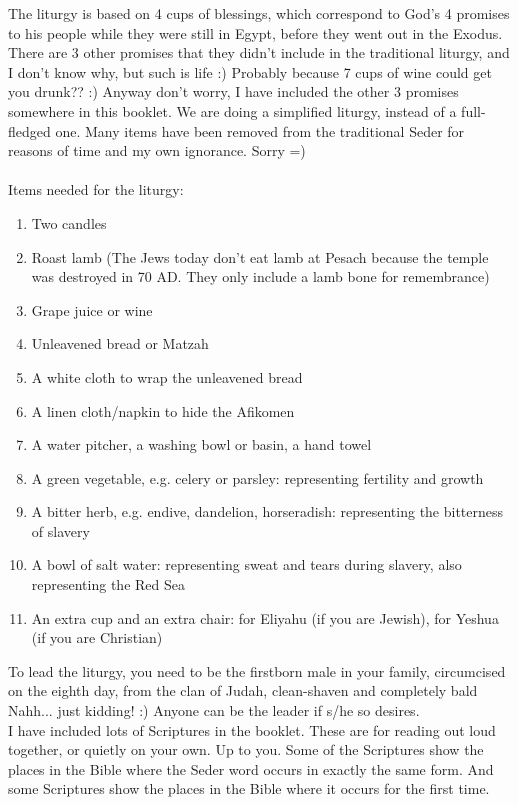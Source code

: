 \documentclass[10pt,oneside,footinclude=true,headinclude=true]{scrbook} %
\begin{document}
The liturgy is based on 4 cups of blessings, which correspond to God's 4 promises to his people while they were still in Egypt, before they went out in the Exodus. There are 3 other promises that they didn't include in the traditional liturgy, and I don't know why, but such is life :) Probably because 7 cups of wine could get you drunk?? :) Anyway don't worry, I have included the other 3 promises somewhere in this booklet. We are doing a simplified liturgy, instead of a full-fledged one. Many items have been removed from the traditional Seder for reasons of time and my own ignorance. Sorry =)\\
\\
Items needed for the liturgy:
\begin{enumerate}
	\item{Two candles}
	\item{Roast lamb (The Jews today don't eat lamb at Pesach because the temple was destroyed in 70 AD. They only include a lamb bone for remembrance)}
	\item{Grape juice or wine}
	\item{Unleavened bread or Matzah}
	\item{A white cloth to wrap the unleavened bread}
	\item{A linen cloth/napkin to hide the Afikomen}
	\item{A water pitcher, a washing bowl or basin, a hand towel}
	\item{A green vegetable, e.g. celery or parsley: representing fertility and growth}
	\item{A bitter herb, e.g. endive, dandelion, horseradish: representing the bitterness of slavery}
	\item{A bowl of salt water: representing sweat and tears during slavery, also representing the Red Sea}
	\item{An extra cup and an extra chair: for Eliyahu (if you are Jewish), for Yeshua (if you are Christian)}
\end{enumerate}

\vspace{5mm}

To lead the liturgy, you need to be the firstborn male in your family, circumcised on the eighth day, from the clan of Judah, clean-shaven and completely bald Nahh... just kidding! :) Anyone can be the leader if s/he so desires.\\

I have included lots of Scriptures in the booklet. These are for reading out loud together, or quietly on your own. Up to you. Some of the Scriptures show the places in the Bible where the Seder word occurs in exactly the same form. And some Scriptures show the places in the Bible where it occurs for the first time.\\
\end{document}
